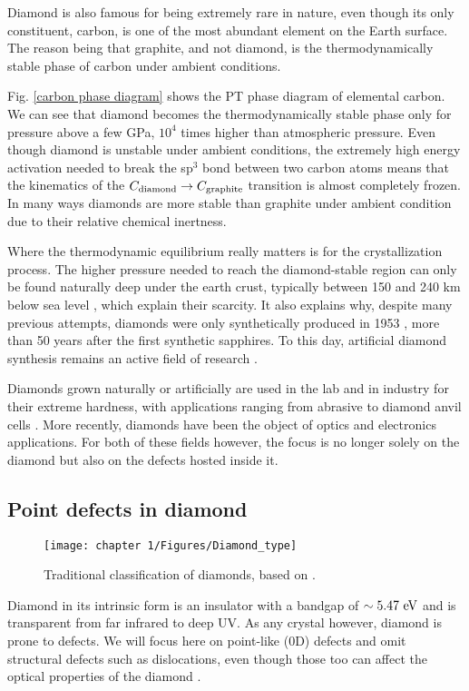 \documentclass[a4paper, 11pt]{report}
\begin{document}
Diamond is also famous for being extremely rare in nature, even though its only constituent, carbon, is one of the most abundant element on the Earth surface. The reason being that graphite, and not diamond, is the thermodynamically stable phase of carbon under ambient conditions.

Fig. \ref{carbon phase diagram} shows the PT phase diagram of elemental carbon. We can see that diamond becomes the thermodynamically stable phase only for pressure above a few GPa, $10^4$ times higher than atmospheric pressure. Even though diamond is unstable under ambient conditions, the extremely high energy activation needed to break the sp$^3$ bond between two carbon atoms means that the kinematics of the $C_{\rm diamond} \to C_{\rm graphite}$ transition is almost completely frozen. In many ways diamonds are more stable than graphite under ambient condition due to their relative chemical inertness.

Where the thermodynamic equilibrium really matters is for the crystallization process. The higher pressure needed to reach the diamond-stable region can only be found naturally deep under the earth crust, typically between 150 and 240 km below sea level \citep{tappert2011diamonds}, which explain their scarcity. It also explains why, despite many previous attempts, diamonds were only synthetically produced in 1953 \citep{barnard2000diamond}, more than 50 years after the first synthetic sapphires. To this day, artificial diamond synthesis remains an active field of research \citep{shenderova2019synthesis, achard2020chemical}.

Diamonds grown naturally or artificially are used in the lab and in industry for their extreme hardness, with applications ranging from abrasive to diamond anvil cells \citep{jayaraman1983diamond}. More recently, diamonds have been the object of optics and electronics applications. For both of these fields however, the focus is no longer solely on the diamond but also on the defects hosted inside it.

\subsection{Point defects in diamond}
\begin{figure}[h!]
\centering
\texttt{[image: chapter 1/Figures/Diamond\_type]}
\caption{Traditional classification of diamonds, based on \citep{tappert2011diamonds}.}
\label{diamond type}
\end{figure}
Diamond in its intrinsic form is an insulator with a bandgap of $\sim 5.47\ \rm eV$ and is transparent from far infrared to deep UV. As any crystal however, diamond is prone to defects. We will focus here on point-like (0D) defects and omit structural defects such as dislocations, even though those too can affect the optical properties of the diamond \citep{collins2000colour}. 
\end{document}
